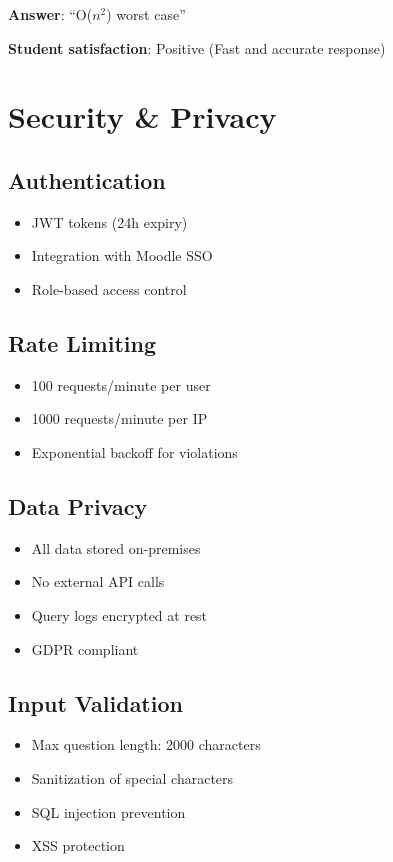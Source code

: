 \documentclass[12pt,a4paper]{article}
\begin{document}
\textbf{Answer}: ``O($n^2$) worst case''

\textbf{Student satisfaction}: Positive (Fast and accurate response)

\section{Security \& Privacy}

\subsection{Authentication}
\begin{itemize}
    \item JWT tokens (24h expiry)
    \item Integration with Moodle SSO
    \item Role-based access control
\end{itemize}

\subsection{Rate Limiting}
\begin{itemize}
    \item 100 requests/minute per user
    \item 1000 requests/minute per IP
    \item Exponential backoff for violations
\end{itemize}

\subsection{Data Privacy}
\begin{itemize}
    \item All data stored on-premises
    \item No external API calls
    \item Query logs encrypted at rest
    \item GDPR compliant
\end{itemize}

\subsection{Input Validation}
\begin{itemize}
    \item Max question length: 2000 characters
    \item Sanitization of special characters
    \item SQL injection prevention
    \item XSS protection
\end{itemize}
\end{document}
